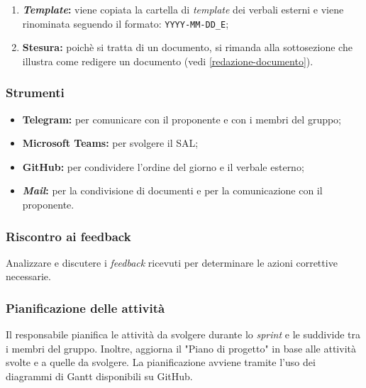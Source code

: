 \begin{itemize}
\begin{enumerate}
		      \item \textbf{\textit{Template}:} viene copiata la cartella di \textit{template} dei
		            verbali esterni e viene rinominata seguendo il formato:
		            \texttt{YYYY-MM-DD\_E};

		      \item \textbf{Stesura:} poichè si tratta di un documento, si
		            rimanda alla sottosezione che illustra come redigere un
		            documento (vedi \cref{redazione-documento}).
	      \end{enumerate}
\end{itemize}

\subsubsection*{Strumenti}
\begin{itemize}
	\item \textbf{Telegram\g:} per comunicare con il proponente e con i membri del
	      gruppo;

	\item \textbf{Microsoft Teams:} per svolgere il SAL\g;

	\item \textbf{GitHub\g:} per condividere l'ordine del giorno e il verbale
	      esterno;

	\item \textbf{\textit{Mail}:} per la condivisione di documenti e per la
	      comunicazione con il proponente.
\end{itemize}






\subsubsection{Riscontro ai feedback\g} 
Analizzare e discutere i
	  \textit{feedback\g} ricevuti per determinare le azioni correttive
	  necessarie.





\subsubsection{Pianificazione delle attività}
\label{pianificazione-attivia}

Il responsabile pianifica le attività da svolgere durante lo \textit{sprint}
e le suddivide tra i membri del gruppo. Inoltre, aggiorna il "Piano di progetto"
in base alle attività svolte e a quelle da svolgere. La pianificazione avviene
tramite l'uso dei diagrammi di Gantt disponibili su GitHub\g.

